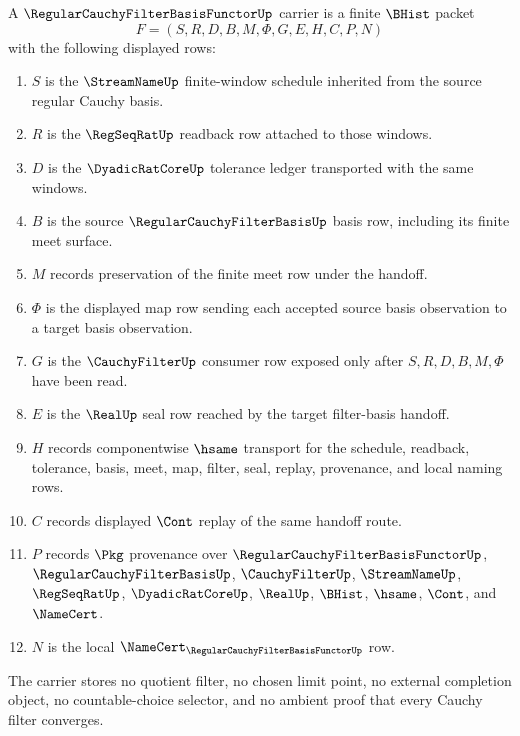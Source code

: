 \begin{definition}
\label{def:regular-cauchy-filter-basis-functor-carrier}
A $\RegularCauchyFilterBasisFunctorUp$ carrier is a finite $\BHist$ packet
$$
F=(S,R,D,B,M,\Phi,G,E,H,C,P,N)
$$
with the following displayed rows:
\begin{enumerate}
\item $S$ is the $\StreamNameUp$ finite-window schedule inherited from the source regular Cauchy basis.
\item $R$ is the $\RegSeqRatUp$ readback row attached to those windows.
\item $D$ is the $\DyadicRatCoreUp$ tolerance ledger transported with the same windows.
\item $B$ is the source $\RegularCauchyFilterBasisUp$ basis row, including its finite meet surface.
\item $M$ records preservation of the finite meet row under the handoff.
\item $\Phi$ is the displayed map row sending each accepted source basis observation to a target basis observation.
\item $G$ is the $\CauchyFilterUp$ consumer row exposed only after $S,R,D,B,M,\Phi$ have been read.
\item $E$ is the $\RealUp$ seal row reached by the target filter-basis handoff.
\item $H$ records componentwise $\hsame$ transport for the schedule, readback, tolerance, basis, meet, map, filter, seal, replay, provenance, and local naming rows.
\item $C$ records displayed $\Cont$ replay of the same handoff route.
\item $P$ records $\Pkg$ provenance over $\RegularCauchyFilterBasisFunctorUp$, $\RegularCauchyFilterBasisUp$, $\CauchyFilterUp$, $\StreamNameUp$, $\RegSeqRatUp$, $\DyadicRatCoreUp$, $\RealUp$, $\BHist$, $\hsame$, $\Cont$, and $\NameCert$.
\item $N$ is the local $\NameCert_{\RegularCauchyFilterBasisFunctorUp}$ row.
\end{enumerate}
The carrier stores no quotient filter, no chosen limit point, no external completion object, no countable-choice selector, and no ambient proof that every Cauchy filter converges.
\end{definition}

